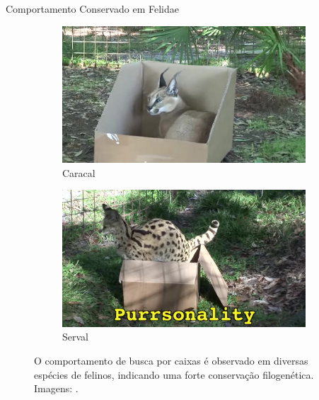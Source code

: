 \documentclass[final]{beamer}
\begin{document}
\begin{frame}[t]
\begin{columns}[T]
\begin{column}{.32\linewidth}
\begin{block}{Comportamento Conservado em Felidae}
\begin{figure}
            \begin{subfigure}[b]{0.49\textwidth}
                \includegraphics[width=\textwidth]{05_rusty_caracal.jpg}
                \caption{Caracal}
            \end{subfigure}
            \hfill
            \begin{subfigure}[b]{0.49\textwidth}
                \includegraphics[width=\textwidth]{06_purrsonality_serval.jpg}
                \caption{Serval}
            \end{subfigure}
                        
            \caption{O comportamento de busca por caixas é observado em diversas espécies de felinos, indicando uma forte conservação filogenética. Imagens: \citet{bigcatrescue2019}.}
            \label{fig:felids_in_boxes}
        \end{figure}
      \end{block}
    \end{column}


\end{columns}
\end{frame}
\end{document}
